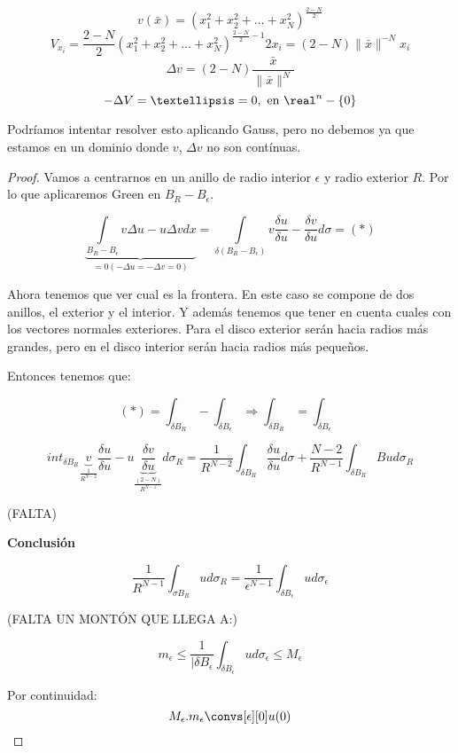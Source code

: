 \begin{itemize}
				\[ v(\bar{x}) = (x_1^2 + x_2^2 + … + x_N^2)^{\frac{2-N}{2}}  \]
				\[ V_{x_i} = \frac{2-N}{2} (x_1^2 + x_2^2 + … + x_N^2)^{\frac{2-N}{2} -1} 2x_i = (2-N) \|\bar{x}\|^{-N} x_i \]
				\[ \Delta v = (2-N) \frac{\bar{x}}{\|\bar{x}\|^N}\]
				\[-\Delta V = … = 0, \text{ en } \real^n-\{0\}\]

				Podríamos intentar resolver esto aplicando Gauss, pero no debemos ya que estamos en un dominio donde $v$, $\Delta v$ no son contínuas.

				\begin{proof}

					Vamos a centrarnos en un anillo de radio interior $\epsilon$ y radio exterior $R$. Por lo que aplicaremos Green en $B_{R}- B_{\epsilon}$.

					\[ \underbrace{ \int\limits_{B_R-B_\epsilon} v \Delta u - u \Delta v dx}_{= 0 (-\Delta u = -\Delta v = 0)} = \int\limits_{\delta(B_R-B_\epsilon)} v \frac{\delta u}{\delta u} - \frac{\delta v}{\delta u} d \sigma = (*) \]

					Ahora tenemos que ver cual es la frontera. En este caso se compone de dos anillos, el exterior y el interior. Y además tenemos que tener en cuenta cuales con los vectores normales exteriores. Para el disco exterior serán hacia radios más grandes, pero en el disco interior serán hacia radios más pequeños.

					Entonces tenemos que:

					\[(*) = \int_{\delta B_R} - \int_{\delta B_\epsilon} \Rightarrow  \int_{\delta B_R} = \int_{\delta B_\epsilon}\]

					\[ int_{\delta B_R} \underbrace{v}_{\frac{1}{R^{N-2}}} \frac{\delta u}{\delta u} - u \underbrace{\frac{\delta v}{\delta u}}_{\frac{(2-N)}{R^{N-1}}} d \sigma_R  = \frac{1}{R^{N-2}} \int_{\delta B_R} \frac{\delta u}{\delta u} d\sigma + \frac{N-2}{R^{N-1}} \int_{\delta B_R} B u d\sigma_R  \]

					(FALTA)

					\textbf{Conclusión}

					\[\frac{1}{R^{N-1}} \int_{\sigma B_R} u d\sigma_R = \frac{1}{\epsilon^{N-1}} \int_{\delta B_\epsilon} u d \sigma_\epsilon \]

					(FALTA UN MONTÓN QUE LLEGA A:)

					\[ m_\epsilon \leq \frac{1}{|\delta B_{\epsilon}} \int_{\delta B_\epsilon} u d \sigma_\epsilon \leq M_\epsilon  \]

					Por continuidad: \[M_\epsilon. m_\epsilon \convs[\epsilon][0] u(0) \]


\end{proof}
\end{itemize}
